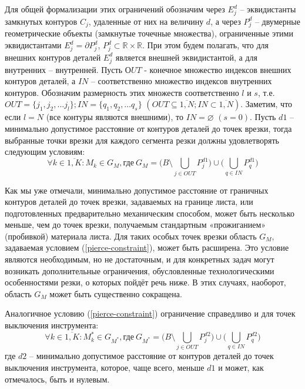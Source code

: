 \documentclass[12pt,twoside]{report}
\begin{document}
Для общей формализации этих ограничений обозначим через
$E_j^d$ – эквидистанты замкнутых контуров $C_j$,
удаленные от них на величину $d$,
а через
$P_j^d$ – двумерные геометрические объекты (замкнутые точечные множества),
ограниченные этими эквидистантами
$E_j^d = \partial P_j^d$,
$P_j^d \subset \mathbb R \times \mathbb R$.
При этом будем полагать,
что для внешних контуров деталей
$E_j^d$
является внешней эквидистантой,
а для внутренних – внутренней.
Пусть $ОUT$ - конечное множество индексов внешних контуров деталей,
а $IN$ – соответственно множество индексов внутренних контуров.
Обозначим  размерность этих множеств соответственно $l$ и $s$,
т.е.
$OUT = \{j_1, j_2, \dots j_l\};
IN = \{q_1, q_2, \dots q_s\}$
$(OUT  \subseteq \overline{1,N};
IN  \subset \overline{1,N})$.
Заметим, что если $l=N$
(все контуры являются внешними), то
$IN = \varnothing$
$(s = 0)$.
Пусть $d1$ – минимально допустимое расстояние от контуров деталей до точек врезки,
тогда выбранные точки врезки для каждого сегмента резки должны удовлетворять следующим условиям:
\begin{equation}
  \forall k \in \overline{1,K}:
  M_k \in G_M,
  \text{где}\:
  G_M = \big(B \setminus \bigcup_{j\in OUT} P_j^{d1} \big)
  \cup
  \big( \bigcup_{q\in IN}P_q^{d1} \big)
  \label{pierce-constraint}
\end{equation}

Как мы уже отмечали,
минимально допустимое расстояние от граничных контуров деталей
до точек врезки,
задаваемых на границе листа,
или подготовленных предварительно механическим способом,
может быть несколько меньше,
чем до точек врезки, получаемым стандартным «прожиганием» (пробивкой) материала листа.
Для таких особых точек врезки область $G_M$,
задаваемая условием (\ref{pierce-constraint}),
может быть расширена.
Это условие являются необходимым, но не достаточным,
и для конкретных задач могут возникать дополнительные ограничения,
обусловленные технологическими особенностями резки,
о которых пойдёт речь ниже.
В этих случаях, наоборот, область $G_M$
может быть существенно сокращена.

Аналогичное условию (\ref{pierce-constraint})
ограничение справедливо и для точек выключения инструмента:
\begin{equation}
  \forall k \in \overline{1,K}:
  M_k^* \in G_{M^*},
  \text{где}\:
  G_{M^*} = \big(B \setminus \bigcup_{j\in OUT} P_j^{d2} \big)
	\cup
  \big( \bigcup_{q\in IN}P_q^{d2} \big)
  \label{tool-off-constraint}
\end{equation}
где $d2$ – минимально допустимое расстояние
от контуров деталей до точек выключения инструмента,
которое, чаще всего, меньше $d1$
и может, как отмечалось, быть и нулевым.
\end{document}
